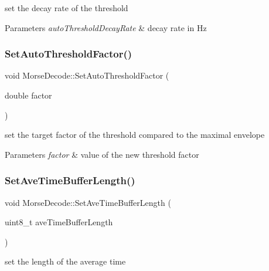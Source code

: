 set the decay rate of the threshold 


\begin{DoxyParams}{Parameters}
{\em auto\+Threshold\+Decay\+Rate} & decay rate in Hz \\
\hline
\end{DoxyParams}
\mbox{\label{classMorseDecode_a71b04d87d48e3eb062068bda7fda6ea9}} 
\subsubsection{\texorpdfstring{Set\+Auto\+Threshold\+Factor()}{SetAutoThresholdFactor()}}
{\footnotesize\ttfamily void Morse\+Decode\+::\+Set\+Auto\+Threshold\+Factor (\begin{DoxyParamCaption}\item[{double}]{factor }\end{DoxyParamCaption})}



set the target factor of the threshold compared to the maximal envelope 


\begin{DoxyParams}{Parameters}
{\em factor} & value of the new threshold factor \\
\hline
\end{DoxyParams}
\mbox{\label{classMorseDecode_ae6da2e624d2ce1c8cbc1324757271627}} 
\subsubsection{\texorpdfstring{Set\+Ave\+Time\+Buffer\+Length()}{SetAveTimeBufferLength()}}
{\footnotesize\ttfamily void Morse\+Decode\+::\+Set\+Ave\+Time\+Buffer\+Length (\begin{DoxyParamCaption}\item[{uint8\+\_\+t}]{ave\+Time\+Buffer\+Length }\end{DoxyParamCaption})}



set the length of the average time 


